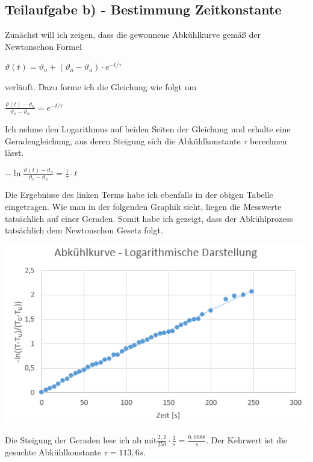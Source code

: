 \documentclass{article}
\begin{document}
\subsection*{Teilaufgabe b) - Bestimmung Zeitkonstante}
Zunächst will ich zeigen, dass die gewonnene Abkühlkurve gemäß der Newtonschon Formel 
\begin{center}
	$\vartheta (t) = \vartheta_u + (\vartheta_o - \vartheta_u) \cdot e^{-t/\tau}$ 
\end{center}
verläuft. Dazu forme ich die Gleichung wie folgt um
\begin{center}
	$\frac{\vartheta (t) - \vartheta_u}{\vartheta_o - \vartheta_u} = e^{-t/\tau}$ 
\end{center}
Ich nehme den Logarithmus auf beiden Seiten der Gleichung und erhalte eine Geradengleichung, 
aus deren Steigung sich die Abkühlkonstante $\tau$ berechnen lässt.
\begin{center}
	$-\ln{\frac{\vartheta (t) - \vartheta_u}{\vartheta_o - \vartheta_u}} = \frac{1}{\tau}\cdot t$ 
\end{center}
Die Ergebnisse des linken Terms habe ich ebenfalls in der obigen Tabelle eingetragen. 
Wie man in der folgenden Graphik sieht, liegen die Messwerte tatsächlich auf einer Geraden. Somit habe ich gezeigt, dass der Abkühlprozess tatsächlich dem Newtonschon Gesetz folgt.  
\begin{center}
	\includegraphics[scale=0.6]{Graph2.png}
\end{center}
Die Steigung der Geraden lese ich ab mit$\frac{2,2}{250}\cdot\frac{1}{s}=\frac{0,0088}{s}$.
Der Kehrwert ist die gesuchte Abkühlkonstante $\tau = 113,6 s$.
\end{document}
